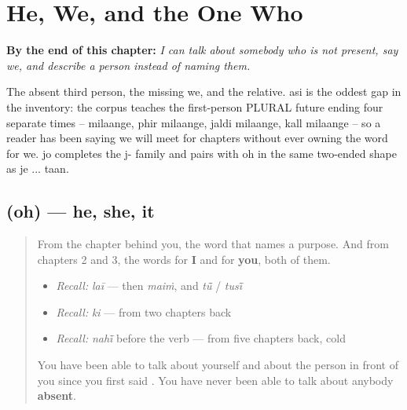 
\chapter{He, We, and the One Who}
\label{ch:pa-pronouns-and-relative}

\begin{chapteropening}
\textbf{By the end of this chapter:} \emph{I can talk about somebody who is not present, say we, and describe a person instead of naming them.}

The absent third person, the missing we, and the relative. asi is the oddest gap in the inventory: the corpus teaches the first-person PLURAL future ending four separate times -- milaange, phir milaange, jaldi milaange, kall milaange -- so a reader has been saying we will meet for chapters without ever owning the word for we. jo completes the j- family and pairs with oh in the same two-ended shape as je ... taan.
\end{chapteropening}

\section[\texorpdfstring{\pa{ਉਹ} (oh)}{ਉਹ (oh)}]{ (oh) — he, she, it}

\label{lesson:PA-C42-oh}



\begin{quote}
From the chapter behind you, the word that names a purpose. And from chapters 2 and 3, the words for \textbf{I} and for \textbf{you}, both of them.

\begin{itemize}
\raggedright
  \item \emph{Recall:} \emph{laī} — then \emph{maiṁ}, and \emph{tū̃} / \emph{tusī̃}
  \item \emph{Recall:} \emph{ki} — from two chapters back
  \item \emph{Recall:} \emph{nahī̃} before the verb — from five chapters back, cold
\end{itemize}

You have been able to talk about yourself and about the person in front of you since you first said \textbf{}. You have never been able to talk about anybody \textbf{absent}.
\end{quote}

